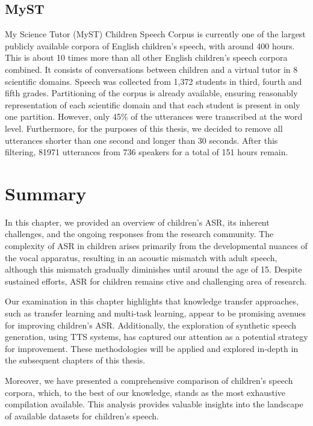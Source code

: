 \subsection{MyST}
My Science Tutor (MyST) Children Speech Corpus \cite{MyST} is currently one of the largest publicly available corpora of English children's speech, with around 400 hours. This is about 10 times more than all other English children's speech corpora combined. It consists of conversations between children and a virtual tutor in 8 scientific domains. Speech was collected from 1,372  students in third, fourth and fifth grades. Partitioning of the corpus is already available, ensuring reasonably representation of each scientific domain and that each student is present in only one partition. However, only 45\% of the utterances were transcribed at the word level. Furthermore, for the purposes of this thesis, we decided to remove all utterances shorter than one second and longer than 30 seconds. After this filtering, 81971 utterances from 736 speakers for a total of 151 hours remain.


\section{Summary}
In this chapter, we provided an overview of children's ASR, its inherent challenges, and the ongoing responses from the research community. The complexity of ASR in children arises primarily from the developmental nuances of the vocal apparatus, resulting in an acoustic mismatch with adult speech, although this mismatch gradually diminishes until around the age of 15. Despite sustained efforts, ASR for children remains ctive and challenging area of research.

Our examination in this chapter highlights that knowledge transfer approaches, such as transfer learning and multi-task learning, appear to be promising avenues for improving children's ASR. Additionally, the exploration of synthetic speech generation, using TTS systems, has captured our attention as a potential strategy for improvement. These methodologies will be applied and explored in-depth in the subsequent chapters of this thesis.

Moreover, we have presented a comprehensive comparison of children's speech corpora, which, to the best of our knowledge, stands as the most exhaustive compilation available. This analysis provides valuable insights into the landscape of available datasets for children's speech.

